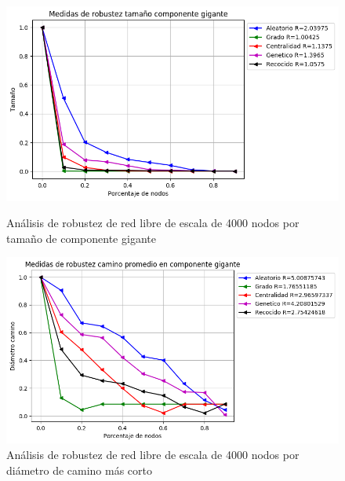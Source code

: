 \begin{figure}[!htb]
    \begin{minipage}{0.48\textwidth}
        \centering
        \includegraphics[scale=0.4]{CapituloAAnexos/imagenesAnexoC/Robustez/grafica_GC20180502_060959ScaleFree4000Nodes}
        \caption{Análisis de robustez de red libre de escala de 4000 nodos por tamaño de componente gigante}
    \end{minipage}\hfill
   \begin{minipage}{0.48\textwidth}
         \centering
       \includegraphics[scale=0.4]{CapituloAAnexos/imagenesAnexoC/Robustez/grafica_APL20180502_060959ScaleFree4000Nodes}
        \caption{Análisis de robustez de red libre de escala de 4000 nodos por diámetro de camino más corto}
    \end{minipage}
\end{figure}


